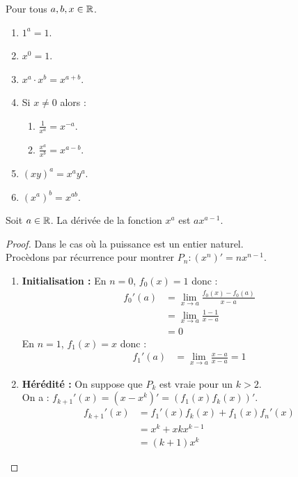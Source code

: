 \begin{proposition}
	Pour tous $a, b, x \in \mathbb{R}$.
    \begin{enumerate}
            \item $1^a = 1$.
            \item $x^0 = 1$.
            \item $x^a \cdot x^b = x^{a + b}$.
            \item Si $x \neq 0$ alors :
            \begin{enumerate}
            	\item $\frac{1}{x^a} = x^{-a}$.
            	\item $\frac{x^a}{x^b} = x^{a - b}$.
            \end{enumerate}
            \item $(xy)^a = x^a y^a$.
            \item $(x^a)^b = x^{ab}$.
        \end{enumerate}
\end{proposition}

\begin{proposition}
	Soit $a \in \mathbb{R}$. La dérivée de la fonction $x^a$ est $ax^{a-1}$.
\end{proposition}

\begin{proof}
	Dans le cas où la puissance est un entier naturel. \\
	Procèdons par récurrence pour montrer $P_n : (x^n)' = nx^{n-1}$.
	\begin{enumerate}
		\item \textbf{Initialisation :} En $n = 0$, $f_0(x) = 1$ donc :
		\begin{align*}
			f_0'(a) &= \lim_{x \to a} \frac{f_0(x) - f_0(a)}{x - a} \\
			 &= \lim_{x \to a} \frac{1 - 1}{x - a} \\
			 &= 0
		\end{align*}
		En $n = 1$, $f_1(x) = x$ donc :
		\begin{align*}
			f_1'(a) &= \lim_{x \to a} \frac{x - a}{x - a} = 1
		\end{align*}
		\item \textbf{Hérédité :} On suppose que $P_k$ est vraie pour un $k > 2$. \\
		On a : $f_{k+1}'(x) = (x - x^k)' = (f_1(x) f_k(x))'$.
		\begin{align*}
			f_{k+1}'(x) &= f_1'(x) f_k(x) + f_1(x) f_n'(x) \\
			&= x^k + xkx^{k-1} \\
			&= (k+1)x^k 
		\end{align*}
	\end{enumerate}
\end{proof}

